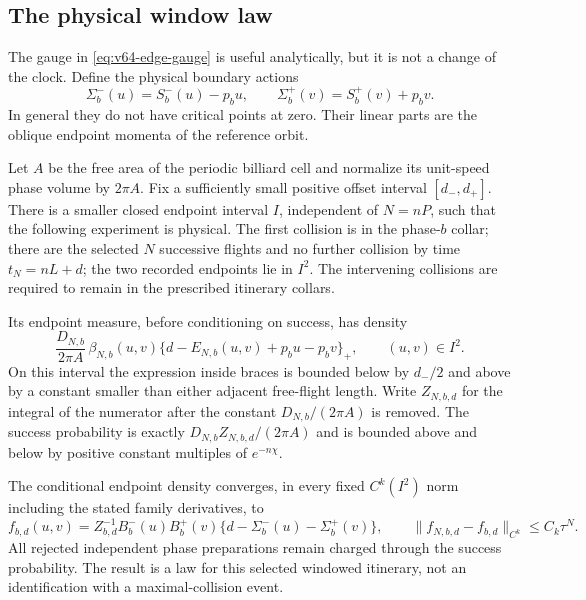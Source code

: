 \subsection{The physical window law}

The gauge in \eqref{eq:v64-edge-gauge} is useful analytically, but it is
not a change of the clock.  Define the physical boundary actions
\begin{equation}\label{eq:v64-physical-actions}
 \Sigma_b^-(u)=S_b^-(u)-p_bu,\qquad
 \Sigma_b^+(v)=S_b^+(v)+p_bv.
\end{equation}
In general they do not have critical points at zero.  Their linear parts
are the oblique endpoint momenta of the reference orbit.

\begin{theorem}
\label{thm:v64-physical-law}
Let $A$ be the free area of the periodic billiard cell and normalize its
unit-speed phase volume by $2\pi A$.  Fix a sufficiently small positive
offset interval $[d_-,d_+]$.  There is a smaller closed endpoint interval
$I$, independent of $N=nP$, such that the following experiment is physical.
The first collision is in the phase-$b$ collar; there are the selected
$N$ successive flights and no further collision by time $t_N=nL+d$;
the two recorded endpoints lie in $I^2$.  The intervening collisions
are required to remain in the prescribed itinerary collars.

Its endpoint measure, before conditioning on success, has density
\begin{equation}\label{eq:v64-phase-density}
 \frac{D_{N,b}}{2\pi A}\,
 \beta_{N,b}(u,v)
       \{d-E_{N,b}(u,v)+p_bu-p_bv\}_+,\qquad (u,v)\in I^2.
\end{equation}
On this interval the expression inside braces is bounded below by
$d_-/2$ and above by a constant smaller than either adjacent free-flight
length.  Write $Z_{N,b,d}$ for the integral of the numerator after the
constant $D_{N,b}/(2\pi A)$ is removed.  The success probability is
exactly $D_{N,b}Z_{N,b,d}/(2\pi A)$ and is bounded above and below by
positive constant multiples of $e^{-n\chi}$.

The conditional endpoint density converges, in every fixed $C^k(I^2)$
norm including the stated family derivatives, to
\begin{equation}\label{eq:v64-limit-law}
 f_{b,d}(u,v)=Z_{b,d}^{-1}B_b^-(u)B_b^+(v)
                \{d-\Sigma_b^-(u)-\Sigma_b^+(v)\},
 \qquad \|f_{N,b,d}-f_{b,d}\|_{C^k}\le C_k\tau^N.
\end{equation}
All rejected independent phase preparations remain charged through the
success probability.  The result is a law for this selected windowed
itinerary, not an identification with a maximal-collision event.
\end{theorem}
